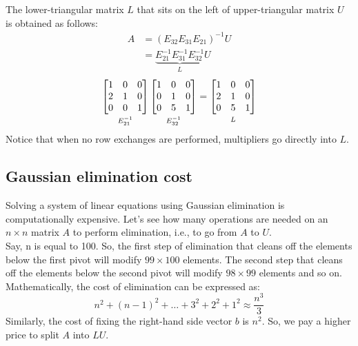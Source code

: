 \documentclass[../main.tex]{subfiles}
\begin{document}
The lower-triangular matrix $L$ that sits on the left of  upper-triangular matrix $U$ is obtained as follows:
\[
    \begin{aligned}
        A & = (E_{32}E_{31}E_{21})^{-1}U                          \\
          & = \underbrace{E_{21}^{-1}E_{31}^{-1}E_{32}^{-1}}_{L}U
    \end{aligned}
\]
\[
    \underbracket[0pt][0pt]{
        \begin{bmatrix*}[r]
            1 & 0 & 0 \\
            2 & 1 & 0 \\
            0 & 0 & 1
        \end{bmatrix*}
    }_{\mathstrut E_{21}^{-1}}
    \underbracket[0pt][0pt]{
        \begin{bmatrix*}[r]
            1 & 0 & 0 \\
            0 & 1 & 0 \\
            0 & 5 & 1
        \end{bmatrix*}
    }_{\mathstrut E_{32}^{-1}}
    =
    \underbracket[0pt][0pt]{
        \begin{bmatrix*}
            1 & 0 & 0 \\
            2 & 1 & 0 \\
            0 & 5 & 1
        \end{bmatrix*}
    }_{\mathstrut L}
\]
Notice that when no row exchanges are performed, multipliers go directly into $L$.



    \subsection{Gaussian elimination cost}
    Solving a system of linear equations using Gaussian elimination is computationally expensive. Let's see how many operations are needed on an $n \times n$ matrix $A$ to perform elimination, i.e., to go from $A$ to $U$. \\

    Say, n is equal to 100. So, the first step of elimination that cleans off the elements below the first pivot will modify $99 \times 100$ elements. The second step that cleans off the elements below the second pivot will modify $98 \times 99$ elements and so on. Mathematically, the cost of elimination can be expressed as:
    \[
        n^2 + (n - 1)^2 + \ldots + 3^2 + 2^2 + 1^2 \approx \frac{n^3}{3}
    \]
    Similarly, the cost of fixing the right-hand side vector $b$ is $n^2$. So, we pay a higher price to split $A$ into $LU$.
\end{document}
